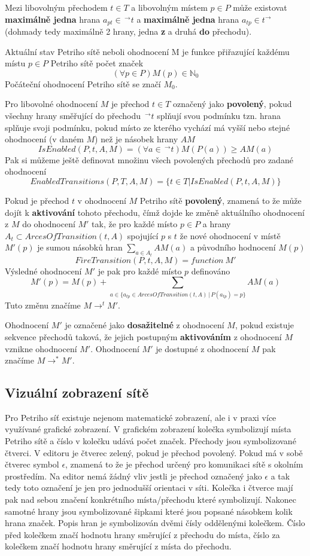 \documentclass[
  biblatex,
  glossaries,
  printversion
]{kidiplom}
\begin{document}
Mezi libovolným přechodem $t \in T$ a libovolným místem $p \in P$ může existovat \textbf{maximálně jedna} 
hrana $a_{pt} \in \,^\to t$
a \textbf{maximálně jedna} hrana $a_{tp} \in t ^\to$ (dohmady tedy maximálně 2 hrany, jedna \textbf{z} a druhá \textbf{do} přechodu).

Aktuální stav Petriho sítě neboli ohodnocení M je funkce přiřazující každému
místu $p \in P$ Petriho sítě počet značek
$$(\forall p \in P) M(p) \in \mathbb{N}_0$$
Počáteční ohodnocení Petriho sítě se značí $M_{0}$.

Pro libovolné ohodnocení $M$ je přechod $t \in T$ označený jako \textbf{povolený},
pokud všechny hrany směřující do přechodu $\,^\to t$ splňují svou podmínku tzn.
hrana splňuje svoji podmínku, pokud místo ze kterého vychází má vyšší nebo stejné ohodnocení
(v daném $M$) než je násobek hrany $AM$
$$IsEnabled(P,t,A,M) = (\forall a \in \,^\to t)M(P(a)) \geq AM(a)$$
Pak si můžeme ještě definovat množinu všech povolených přechodů pro zadané ohodnocení
$$
  EnabledTransitions(P,T,A,M) =
  \{ t \in T | IsEnabled(P,t,A,M) \}
$$

Pokud je přechod $t$ v ohodnocení $M$ Petriho sítě \textbf{povolený}, znamená to že může dojít
k \textbf{aktivování} tohoto přechodu, čímž dojde ke změně aktuálního ohodnocení z $M$ do ohodnocení $M'$
tak, že pro každé místo $p \in P$ a hrany $A_{t} \subset ArcesOfTransition(t,A)$ 
spojující $p$ s $t$ že nové ohodnocení 
v místě $M'(p)$ je sumou násobků 
hran $\sum_{a \in A_{t}} AM(a)$ a původního hodnocení $M(p)$
$$
  FireTransition(P,t,A,M) = function\:M'
$$
Výsledné ohodnocení $M'$ je pak pro každé místo $p$ definováno
$$
  M'(p) = M(p) + \sum_{a \in \{a_{tp} \in ArcesOfTransition(t,A) \,|\, P(a_{tp}) = p \}} AM(a)
$$
Tuto změnu značíme $M \to ^t M'$.

Ohodnocení $M'$ je označené jako 
\textbf{dosažitelné} z ohodnocení $M$, 
pokud existuje sekvence přechodů taková, že jejich postupným 
\textbf{aktivováním} z ohodnocení $M$ vznikne ohodnocení $M'$.
Ohodnocení $M'$ je dostupné z ohodnocení $M$ pak značíme 
$M \to ^* M'$.


\subsection{Vizuální zobrazení sítě}

Pro Petriho síť existuje nejenom matematické zobrazení, ale i
v praxi více využívané grafické zobrazení. 
V grafickém zobrazení kolečka symbolizují místa Petriho sítě
a číslo v kolečku udává počet značek. 
Přechody jsou symbolizované 
čtverci. V editoru je čtverec zelený, pokud je přechod povolený.
Pokud má v sobě čtverec symbol $\epsilon$, znamená to že je 
přechod určený pro komunikaci sítě s okolním prostředím.
Na editor nemá žádný vliv jestli je přechod označený jako $\epsilon$
a tak tedy toto označení je jen pro jednodušší orientaci v síti.
Kolečka i čtverce mají pak nad sebou značení 
konkrétního místa/přechodu které symbolizují. 
Nakonec samotné hrany jsou symbolizované šipkami které jsou 
popsané násobkem kolik hrana  značek.
Popis hran je symbolizován dvěmi čísly oddělenými kolečkem.
Číslo před kolečkem značí hodnotu hrany směrující z přechodu 
do místa, číslo za kolečkem značí hodnotu hrany směrující z 
místa do přechodu.
\end{document}
